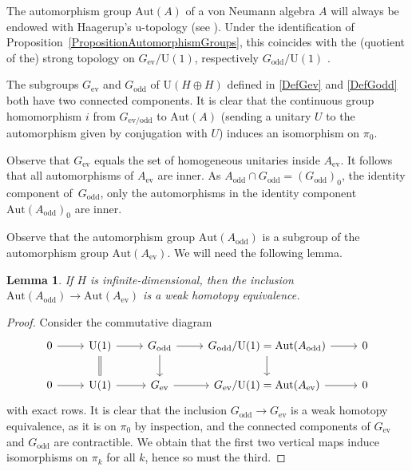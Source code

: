 \documentclass[11pt]{article}
\numberwithin{equation}{section}
\numberwithin{equation}{section}
\newtheorem{Lemma}[Theorem]{Lemma}
\newcommand{\Aut}{\mathrm{Aut}}
\newcommand{\U}{\mathrm{U}}
\begin{document}
The automorphism group $\Aut(A)$ of a von Neumann algebra $A$ will always be endowed with Haagerup's u-topology (see \cite[Section~3]{HaagerupStandardForm}).
Under the identification of Proposition~\ref{PropositionAutomorphismGroups}, this coincides with the (quotient of the) strong topology on $G_{\mathrm{ev}}/\U(1)$, respectively $G_{\mathrm{odd}}/\U(1)$ \cite[Corollary~3.8]{HaagerupStandardForm}.

\begin{Remark} \label{RemarkComponentsAutA}
The subgroups $G_{\mathrm{ev}}$ and $G_{\mathrm{odd}}$ of $\U(H \oplus H)$ defined in \eqref{DefGev} and \eqref{DefGodd} both have two connected components.
It is clear that the continuous group homomorphism $i$ from $G_{\mathrm{ev}/\mathrm{odd}}$ to $\Aut(A)$ (sending a unitary $U$ to the automorphism given by conjugation with $U$) induces an isomorphism on $\pi_0$.
\end{Remark}

\begin{Remark}
Observe that $G_{\mathrm{ev}}$ equals the set of homogeneous unitaries inside $A_{\mathrm{ev}}$.
It follows that all automorphisms of $A_{\mathrm{ev}}$ are inner.
As $A_{\mathrm{odd}} \cap G_{\mathrm{odd}} = (G_{\mathrm{odd}})_0$, the identity component of~$G_{\mathrm{odd}}$, only the automorphisms in the identity component $\Aut(A_{\mathrm{odd}})_0$ are inner.
\end{Remark}

Observe that the automorphism group $\Aut(A_{\mathrm{odd}})$ is a subgroup of the automorphism group $\Aut(A_{\mathrm{ev}})$.
We will need the following lemma.

\begin{Lemma} \label{WeakHomotopyEquivalence}
If $H$ is infinite-dimensional, then the inclusion $\Aut(A_{\mathrm{odd}}) \to \Aut(A_{\mathrm{ev}})$ is a weak homotopy equivalence.
\end{Lemma}

\begin{proof}
Consider the commutative diagram
\begin{equation*}
\begin{tikzcd}
 0 \ar[r] & \U(1) \ar[r] \ar[d, equal] & G_{\mathrm{odd}} \ar[d] \ar[r] & G_{\mathrm{odd}}/\U(1) = \Aut(A_{\mathrm{odd}})\ar[r] \ar[d] & 0 \\
 0 \ar[r] & \U(1) \ar[r] & G_{\mathrm{ev}} \ar[r] & G_{\mathrm{ev}}/\U(1) = \Aut(A_{\mathrm{ev}}) \ar[r] & 0
\end{tikzcd}
\end{equation*}
with exact rows.
It is clear that the inclusion $G_{\mathrm{odd}} \to G_{\mathrm{ev}}$ is a weak homotopy equivalence, as it is on $\pi_0$ by inspection, and the connected components of $G_{\mathrm{ev}}$ and $G_{\mathrm{odd}}$ are contractible.
We obtain that the first two vertical maps induce isomorphisms on $\pi_k$ for all $k$, hence so must the third.
\end{proof}
\end{document}
